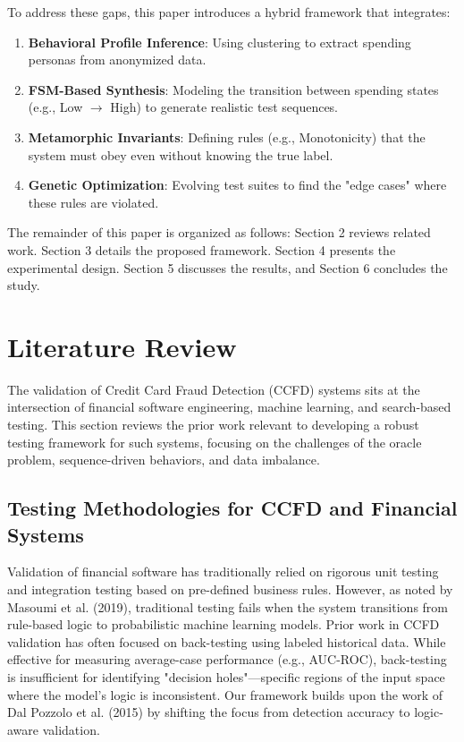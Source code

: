 \documentclass[review]{elsarticle}
\begin{document}
To address these gaps, this paper introduces a hybrid framework that integrates:
\begin{enumerate}
    \item \textbf{Behavioral Profile Inference}: Using clustering to extract spending personas from anonymized data.
    \item \textbf{FSM-Based Synthesis}: Modeling the transition between spending states (e.g., Low $\to$ High) to generate realistic test sequences.
    \item \textbf{Metamorphic Invariants}: Defining rules (e.g., Monotonicity) that the system must obey even without knowing the true label.
    \item \textbf{Genetic Optimization}: Evolving test suites to find the "edge cases" where these rules are violated.
\end{enumerate}

The remainder of this paper is organized as follows: Section 2 reviews related work. Section 3 details the proposed framework. Section 4 presents the experimental design. Section 5 discusses the results, and Section 6 concludes the study.

\section{Literature Review}
\label{sec:lit_review}
The validation of Credit Card Fraud Detection (CCFD) systems sits at the intersection of financial software engineering, machine learning, and search-based testing. This section reviews the prior work relevant to developing a robust testing framework for such systems, focusing on the challenges of the oracle problem, sequence-driven behaviors, and data imbalance.

\subsection{Testing Methodologies for CCFD and Financial Systems}
Validation of financial software has traditionally relied on rigorous unit testing and integration testing based on pre-defined business rules. However, as noted by Masoumi et al. (2019), traditional testing fails when the system transitions from rule-based logic to probabilistic machine learning models. Prior work in CCFD validation has often focused on back-testing using labeled historical data. While effective for measuring average-case performance (e.g., AUC-ROC), back-testing is insufficient for identifying "decision holes"—specific regions of the input space where the model's logic is inconsistent. Our framework builds upon the work of Dal Pozzolo et al. (2015) by shifting the focus from detection accuracy to logic-aware validation.
\end{document}

